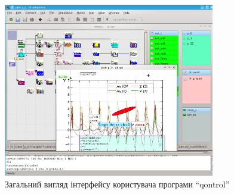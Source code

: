 \documentclass[14pt,handout,utf8]{beamer}
\newcommand{\Xhead}[1]{
 \begin{center}%
      \textbf{#1}%
 \end{center}%
}
\begin{document}
\begin{frame}
  \frametitle{~}

  \begin{figure}[htb!]
    \begin{center}
      \includegraphics[width=0.82\textwidth]{../p4/p/qontrol_all.png}
    \end{center}
    \caption{Загальний вигляд інтерфейсу користувача програми ``qontrol''}
    \label{atu:f:qontrol_all}
  \end{figure}



\end{frame}
\end{document}
